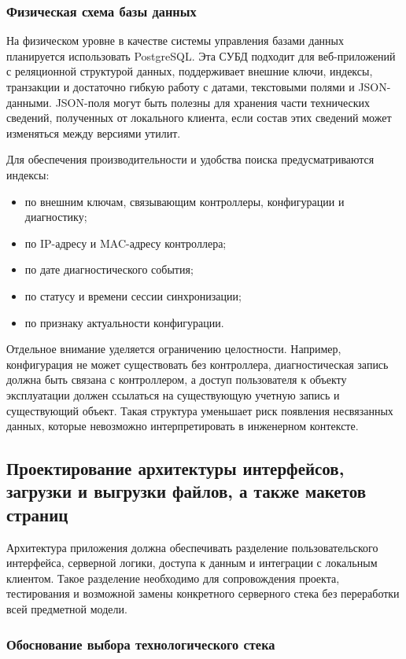 \subsubsection{Физическая схема базы данных}

На физическом уровне в качестве системы управления базами данных планируется
использовать PostgreSQL. Эта СУБД подходит для веб-приложений с реляционной
структурой данных, поддерживает внешние ключи, индексы, транзакции и достаточно
гибкую работу с датами, текстовыми полями и JSON-данными. JSON-поля могут быть
полезны для хранения части технических сведений, полученных от локального
клиента, если состав этих сведений может изменяться между версиями утилит.

Для обеспечения производительности и удобства поиска предусматриваются индексы:
\begin{itemize}
    \item по внешним ключам, связывающим контроллеры, конфигурации и диагностику;
    \item по IP-адресу и MAC-адресу контроллера;
    \item по дате диагностического события;
    \item по статусу и времени сессии синхронизации;
    \item по признаку актуальности конфигурации.
\end{itemize}

Отдельное внимание уделяется ограничению целостности. Например, конфигурация не
может существовать без контроллера, диагностическая запись должна быть связана с
контроллером, а доступ пользователя к объекту эксплуатации должен ссылаться на
существующую учетную запись и существующий объект. Такая структура уменьшает
риск появления несвязанных данных, которые невозможно интерпретировать в
инженерном контексте.

\subsection{Проектирование архитектуры интерфейсов, загрузки и выгрузки файлов, а также макетов страниц}

Архитектура приложения должна обеспечивать разделение пользовательского
интерфейса, серверной логики, доступа к данным и интеграции с локальным
клиентом. Такое разделение необходимо для сопровождения проекта, тестирования и
возможной замены конкретного серверного стека без переработки всей предметной
модели.

\subsubsection{Обоснование выбора технологического стека}

